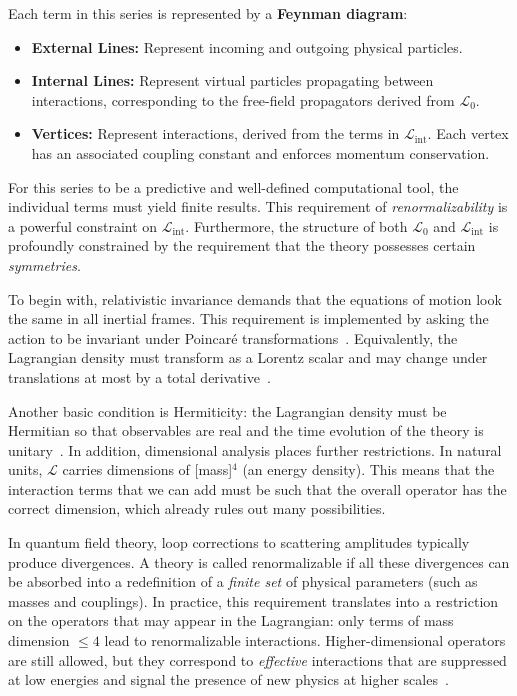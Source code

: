 Each term in this series is represented by a \textbf{Feynman diagram}:
\begin{itemize}
    \item \textbf{External Lines:} Represent incoming and outgoing physical particles.
    \item \textbf{Internal Lines:} Represent virtual particles propagating between interactions, corresponding to the free-field propagators derived from $\mathcal{L}_0$.
    \item \textbf{Vertices:} Represent interactions, derived from the terms in $\mathcal{L}_{\text{int}}$. Each vertex has an associated coupling constant and enforces momentum conservation.
\end{itemize}

For this series to be a predictive and well-defined computational tool, the individual terms must yield finite results. This requirement of \textit{renormalizability} is a powerful constraint on $\mathcal{L}_{\text{int}}$. Furthermore, the structure of both $\mathcal{L}_0$ and $\mathcal{L}_{\text{int}}$ is profoundly constrained by the requirement that the theory possesses certain \textit{symmetries}.

To begin with, relativistic invariance demands that the equations of motion look the same in all inertial frames. This requirement is implemented by asking the action to be invariant under Poincaré transformations~\parencite{pall}. Equivalently, the Lagrangian density must transform as a Lorentz scalar and may change under translations at most by a total derivative~\parencite{jose1998classical}. 

Another basic condition is Hermiticity: the Lagrangian density must be Hermitian so that observables are real and the time evolution of the theory is unitary~\parencite{pall,peskin}. In addition, dimensional analysis places further restrictions. In natural units, $\mathcal{L}$ carries dimensions of [mass]$^4$ (an energy density). This means that the interaction terms that we can add must be such that the overall operator has the correct dimension, which already rules out many possibilities. 

In quantum field theory, loop corrections to scattering amplitudes typically produce divergences. A theory is called renormalizable if all these divergences can be absorbed into a redefinition of a \emph{finite set} of physical parameters (such as masses and couplings). In practice, this requirement translates into a restriction on the operators that may appear in the Lagrangian: only terms of mass dimension $\leq 4$ lead to renormalizable interactions. Higher-dimensional operators are still allowed, but they correspond to \emph{effective} interactions that are suppressed at low energies and signal the presence of new physics at higher scales~\parencite{peskin,Weinberg}. 

